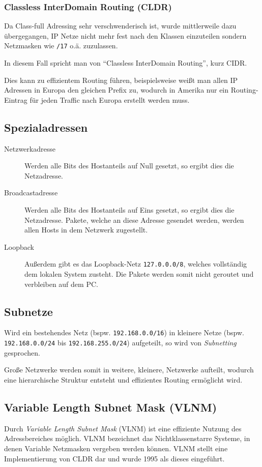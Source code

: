 			\subsubsection{Classless InterDomain Routing (CLDR)}
				Da Class-full Adressing sehr verschwenderisch ist, wurde mittlerweile dazu übergegangen, IP Netze nicht mehr fest nach den Klassen einzuteilen sondern Netzmasken wie \texttt{/17} o.ä. zuzulassen.

				In diesem Fall spricht man von \enquote{Classless InterDomain Routing}, kurz CIDR.

				Dies kann zu effizientem Routing führen, beispielsweise weißt man allen IP Adressen in Europa den gleichen Prefix zu, wodurch in Amerika nur ein Routing-Eintrag für jeden Traffic nach Europa erstellt werden muss.

		\subsection{Spezialadressen}
			\begin{description}
				\item[Netzwerkadresse] Werden alle Bits des Hostanteils auf Null gesetzt, so ergibt dies die Netzadresse.
				\item[Broadcastadresse] Werden alle Bits des Hostanteils auf Eins gesetzt, so ergibt dies die Netzadresse. Pakete, welche an diese Adresse gesendet werden, werden allen Hosts in dem Netzwerk zugestellt.
				\item[Loopback] Außerdem gibt es das Loopback-Netz \texttt{127.0.0.0/8}, welches vollständig dem lokalen System zusteht. Die Pakete werden somit nicht geroutet und verbleiben auf dem PC.
			\end{description}

		\subsection{Subnetze}
			Wird ein bestehendes Netz (bspw. \texttt{192.168.0.0/16}) in kleinere Netze (bspw. \texttt{192.168.0.0/24} bis \texttt{192.168.255.0/24}) aufgeteilt, so wird von \textit{Subnetting} gesprochen.

			Große Netzwerke werden somit in weitere, kleinere, Netzwerke aufteilt, wodurch eine hierarchische Struktur entsteht und effizientes Routing ermöglicht wird.

		\subsection{Variable Length Subnet Mask (VLNM)}
			Durch \textit{Variable Length Subnet Mask} (VLNM) ist eine effiziente Nutzung des Adressbereiches möglich. VLNM bezeichnet das Nichtklassenstarre Systeme, in denen Variable Netzmasken vergeben werden können. VLNM stellt eine Implementierung von CLDR dar und wurde 1995 als dieses eingeführt.

